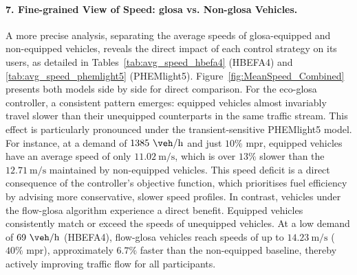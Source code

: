 \paragraph{7. Fine-grained View of Speed: \ac{glosa} vs. Non-\ac{glosa} Vehicles.}
A more precise analysis, separating the average speeds of \ac{glosa}-equipped and non-equipped vehicles, reveals the direct impact of each control strategy on its users, as detailed in Tables~\vref{tab:avg_speed_hbefa4} (HBEFA4) and \vref{tab:avg_speed_phemlight5} (PHEMlight5). Figure~\vref{fig:MeanSpeed_Combined} presents both models side by side for direct comparison. For the \ac{eco-glosa} controller, a consistent pattern emerges: equipped vehicles almost invariably travel slower than their unequipped counterparts in the same traffic stream. This effect is particularly pronounced under the transient-sensitive PHEMlight5 model. For instance, at a demand of $1385~\unit{\veh\per\hour}$ and just $10\%$ \ac{mpr}, equipped vehicles have an average speed of only $11.02~\unit{\metre\per\second}$, which is over $13\%$ slower than the $12.71~\unit{\metre\per\second}$ maintained by non-equipped vehicles. This speed deficit is a direct consequence of the controller's objective function, which prioritises fuel efficiency by advising more conservative, slower speed profiles. In contrast, vehicles under the \ac{flow-glosa} algorithm experience a direct benefit. Equipped vehicles consistently match or exceed the speeds of unequipped vehicles. At a low demand of $69~\unit{\veh\per\hour}$ (HBEFA4), \ac{flow-glosa} vehicles reach speeds of up to $14.23~\unit{\metre\per\second}$ ($40\%$ \ac{mpr}), approximately $6.7\%$ faster than the non-equipped baseline, thereby actively improving traffic flow for all participants.

